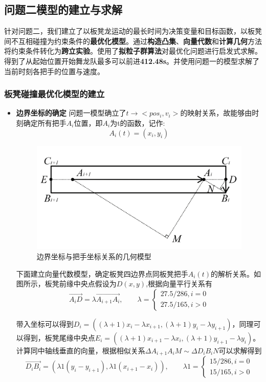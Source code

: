\documentclass[a4paper]{article}
\begin{document}
	\subsection{问题二模型的建立与求解}
	     针对问题二，我们建立了以板凳龙运动的最长时间为决策变量和目标函数，以板凳间不互相碰撞为约束条件的\textbf{最优化模型}。通过\textbf{构造凸集}、\textbf{向量代数}和\textbf{计算几何}方法将约束条件转化为\textbf{跨立实验}。使用了\textbf{拟粒子群算法}对最优化问题进行启发式求解。得到了从起始位置开始舞龙队最多可以前进\textbf{412.48s}。并使用问题一的模型求解了当前时刻各把手的位置与速度。

        \subsubsection{板凳碰撞最优化模型的建立}
    \begin{itemize}
        \item {\textbf{边界坐标的确定}}
        问题一模型确立了$t\to<pos_i,v_i>$的映射关系，故能够由时刻确定所有把手$A_{i}$位置，即$A_{i}$为t的函数，记作:$$A_{i}(t) = (x_i, y_i)$$
        \begin{figure}[H]
            \centering
            \includegraphics[width=0.5\linewidth]{image/Figure_5211.png}
            \caption{边界坐标与把手坐标关系的几何模型}
            \label{fig:enter-label}
        \end{figure}

        下面建立向量代数模型，确定板凳四边界点同板凳把手$A_i(t)$的解析关系。如图所示，板凳前缘中央点假设为$D(x,y)$,根据向量平行关系有
        $$
                   \overrightarrow{A_iD} = \lambda\overrightarrow{A_{i+1}A_i}
        ,\quad\quad \lambda = \left\{ \begin{array}{c}
              27.5 / 286, i = 0 \\
              27.5 / 165, i > 0

        \end{array}\right.
        $$

        带入坐标可以得到$D_i = ((\lambda + 1) x_{i} - \lambda x_{i + 1}, (\lambda + 1) y_{i} - \lambda y_{i + 1})$，同理可以得到，板凳尾缘中央点$E_i = ((\lambda + 1) x_{i + 1} - \lambda x_{i}, (\lambda + 1) y_{i + 1} - \lambda y_{i})$。
        计算同中轴线垂直的向量，根据相似关系$\Delta A_{i+ 1}A_iM \sim \Delta D_iB_iN$可以求解得到
        $$\overrightarrow{D_i B_i} = (\lambda 1 (y_i - y_{i + 1}), \lambda 1 (x_{i + 1} - x_i)),
        \quad \quad \lambda 1 = \left\{ \begin{array}{c}
             15/286, i = 0  \\
             15/165, i > 0
        \end{array}
        \right.$$


\end{itemize}
\end{document}
